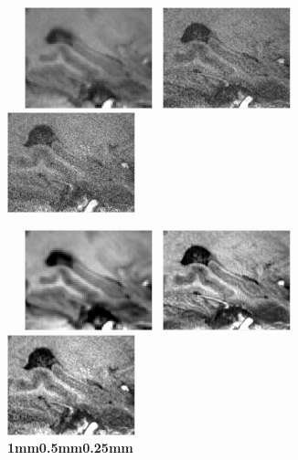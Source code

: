 \documentclass[]{article}
\begin{document}
\begin{figure}
~
~{\includegraphics[width=0.33\textwidth]{noisy5023_200_y.pdf}}~
{\includegraphics[width=0.33\textwidth]{noisy5023_400_y.pdf}}~
{\includegraphics[width=0.33\textwidth]{noisy5023_700_y.pdf}}~\\
\vspace{-1em}


~
~{\includegraphics[width=0.33\textwidth]{denoised5023_200_y.pdf}}~
{\includegraphics[width=0.33\textwidth]{denoised5023_400_y.pdf}}~
{\includegraphics[width=0.33\textwidth]{denoised5023_700_y.pdf}}\\
	\vspace{-1em}
\hspace{5em}\textbf{1mm}\hspace{9em}\textbf{0.5mm}\hspace{8em}\textbf{0.25mm}

\end{figure}
\end{document}
